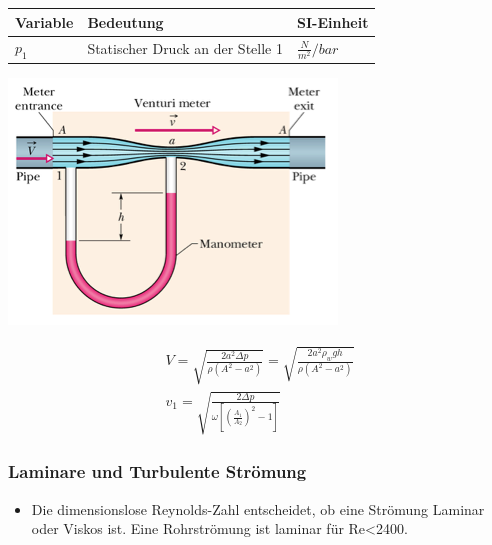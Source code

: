 \documentclass[
a4paper,
oneside,
landscape, 
8pt,
]{scrartcl}
\begin{document}
\begin{multicols*}{2}
\begin{tabbing}
	\begin{tabu} to \linewidth {l X l}
		Variable & Bedeutung & SI-Einheit \\
		\midrule
		$p_{1}$ & Statischer Druck an der Stelle 1 & $\frac{N}{m^2} / bar$ \\
		\bottomrule
	\end{tabu}
\end{tabbing}

\begin{minipage}[h!]{0.4\linewidth}
	\includegraphics[width=\linewidth]{images/bernoulli}
\end{minipage}
\hfill
\begin{minipage}[h!]{0.6\linewidth}
	\begin{align*}
	V = \sqrt{\frac{2a^2 \Delta p}{\rho(A^2-a^2 )}} = \sqrt{\frac{2a^2 \rho_w gh}{\rho(A^2-a^2 )}} \\
	v_1 = \sqrt{\frac{2 \Delta p}{\omega [ (\frac{A_1}{A_2})^2 - 1 ]}}
	\end{align*}
\end{minipage}

\subsubsection{Laminare und Turbulente Strömung}
\begin{itemize}
	\item Die dimensionslose Reynolds-Zahl entscheidet, ob eine Strömung Laminar oder Viskos ist. Eine Rohrströmung ist laminar für Re<2400.
\end{itemize}


\end{multicols*}
\end{document}
